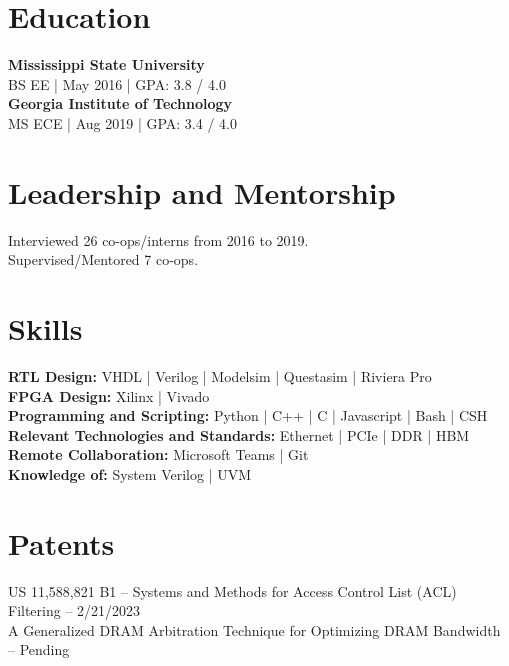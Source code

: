 \documentclass[10pt]{deedy-resume-reversed}
\begin{document}
\begin{minipage}[t]{0.40\textwidth}


\section{Education}
\textbf{Mississippi State University} \\ BS EE | May 2016 | GPA: 3.8 / 4.0 \\
\textbf{Georgia Institute of Technology} \\ MS ECE | Aug 2019 | GPA: 3.4 / 4.0 
\sectionsep


\section{Leadership and Mentorship}
Interviewed 26 co-ops/interns from 2016 to 2019.\\
Supervised/Mentored 7 co-ops.
\sectionsep



\end{minipage}
\hfill
\begin{minipage}[t]{0.55\textwidth}


\section{Skills}
\textbf{RTL Design:} VHDL | Verilog | Modelsim | Questasim | Riviera Pro \\ 
\textbf{FPGA Design:} Xilinx | Vivado \\
\textbf{Programming and Scripting:} Python | C++ | C | Javascript | Bash | CSH \\
\textbf{Relevant Technologies and Standards:} Ethernet | PCIe | DDR | HBM \\
\textbf{Remote Collaboration:} Microsoft Teams | Git \\
\textbf{Knowledge of:} System Verilog | UVM \\
\sectionsep

\end{minipage}

\hfill
\begin{minipage}[t]{1.0\textwidth}


\section{Patents}
US 11,588,821 B1 – Systems and Methods for Access Control List (ACL) Filtering – 2/21/2023 \\
A Generalized DRAM Arbitration Technique for Optimizing DRAM Bandwidth – Pending
\sectionsep

\end{minipage}
\end{document}
